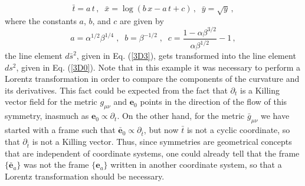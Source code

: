 \documentclass[twocolumn,prd,aps,showpacs,showkeys,amsmath,amssymb]{revtex4-1}
\newcommand{\bl}{\boldsymbol}
\begin{document}
$$ \bar{t} = a\, t \,,\;\;  \bar{x} = \log\left( b\,x - a\, t + c  \right)  \,,\;\; \bar{y} = \sqrt{y} \,, $$
where the constants $a$, $b$, and $c$ are given by
$$ a = \alpha^{1/2}\beta^{1/4}\;,\;\; b = \beta^{-1/2} \;,\;\; c = \frac{1-\alpha\beta^{3/2}}{\alpha \beta^{1/2}}  -1 \,, $$
the line element $d\bar{s}^2$, given in Eq. (\ref{3D3}), gets transformed into the line element $ds^2$, given in Eq. (\ref{3D0}). Note that in this example it was necessary to perform a Lorentz transformation in order to compare the components of the curvature and its derivatives. This fact could be expected from the fact that $\partial_t$ is a Killing vector field for the metric $g_{\mu\nu}$ and $\bl{e}_0$ points in the direction of the flow of this symmetry, inasmuch as $\bl{e}_0 \propto \partial_t$. On the other hand, for the metric $\bar{g}_{\mu\nu}$ we have started with a frame such that
$\bar{\bl{e}}_0 \propto \partial_{\bar{t}}$, but now $\bar{t}$ is not a cyclic coordinate, so that $\partial_{\bar{t}}$ is not a Killing vector. Thus, since symmetries are geometrical concepts that are independent of coordinate systems, one could already tell that the frame $\{\bar{\bl{e}}_a\}$ was not the frame $\{\bl{e}_a\}$ written in another coordinate system, so that a Lorentz transformation should be necessary.
\end{document}
